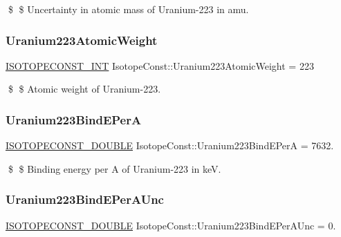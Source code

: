 \$ \$ Uncertainty in atomic mass of Uranium-\/223 in amu. \mbox{\label{group___isotope_const-_uranium-_u223_gac921136c1af6b40627f9813215402377}} 
\subsubsection{\texorpdfstring{Uranium223\+Atomic\+Weight}{Uranium223AtomicWeight}}
{\footnotesize\ttfamily \mbox{\hyperlink{group___isotope_const-_macros_ga5f18360b3e99483a35c32d789e62621c}{I\+S\+O\+T\+O\+P\+E\+C\+O\+N\+S\+T\+\_\+\+I\+NT}} Isotope\+Const\+::\+Uranium223\+Atomic\+Weight = 223}

\$ \$ Atomic weight of Uranium-\/223. \mbox{\label{group___isotope_const-_uranium-_u223_gaaed45d024e10ac5d36c4f28a8e29d43d}} 
\subsubsection{\texorpdfstring{Uranium223\+Bind\+E\+PerA}{Uranium223BindEPerA}}
{\footnotesize\ttfamily \mbox{\hyperlink{group___isotope_const-_macros_ga8f45a7272ce02c0b4c65c44636ed719a}{I\+S\+O\+T\+O\+P\+E\+C\+O\+N\+S\+T\+\_\+\+D\+O\+U\+B\+LE}} Isotope\+Const\+::\+Uranium223\+Bind\+E\+PerA = 7632.}

\$ \$ Binding energy per A of Uranium-\/223 in keV. \mbox{\label{group___isotope_const-_uranium-_u223_ga544c9941f799ba77b918c0a61fd5df3c}} 
\subsubsection{\texorpdfstring{Uranium223\+Bind\+E\+Per\+A\+Unc}{Uranium223BindEPerAUnc}}
{\footnotesize\ttfamily \mbox{\hyperlink{group___isotope_const-_macros_ga8f45a7272ce02c0b4c65c44636ed719a}{I\+S\+O\+T\+O\+P\+E\+C\+O\+N\+S\+T\+\_\+\+D\+O\+U\+B\+LE}} Isotope\+Const\+::\+Uranium223\+Bind\+E\+Per\+A\+Unc = 0.}

